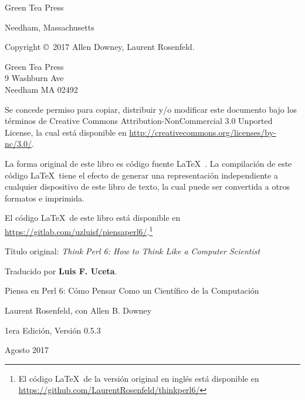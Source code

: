 \documentclass[10pt]{book}
\newcommand{\thetitle}{Piensa en Perl 6: Cómo Pensar Como un Científico de la Computación}
\newcommand{\theversion}{1era Edición, Versión 0.5.3}
\newcommand{\thedate}{Agosto 2017}
\begin{document}
\begin{latexonly}
\begin{flushright}
{\Large Green Tea Press}

{\small Needham, Massachusetts}

\vfill

\end{flushright}


\pagebreak
\thispagestyle{empty}

{\small
Copyright \copyright ~2017 Allen Downey, Laurent Rosenfeld.


\vspace{0.2in}

\begin{flushleft}
Green Tea Press       \\
9 Washburn Ave        \\
Needham MA 02492
\end{flushleft}

Se concede permiso para copiar, distribuir y/o modificar
este documento bajo los términos de Creative Commons Attribution-NonCommercial 3.0 Unported
License, la cual está disponible en \url{http://creativecommons.org/licenses/by-nc/3.0/}.

La forma original de este libro es código fuente \LaTeX\ . La compilación de
este código \LaTeX\ tiene el efecto de generar una representación independiente
a cualquier dispositivo de este libro de texto, la cual puede ser convertida a
otros formatos e imprimida.

El código \LaTeX\ de este libro está disponible en
\url{https://gitlab.com/uzluisf/piensaperl6/}.\footnote{
El código \LaTeX\ de la versión original en inglés está disponible en
\url{https://github.com/LaurentRosenfeld/thinkperl6/}
}

Título original: \emph{Think Perl 6: How to Think Like a Computer Scientist}

Traducido por {\bf Luis F. Uceta}.

\vspace{0.2in}

} %

\end{latexonly}



\begin{htmlonly}


{\Large \thetitle}

{\large Laurent Rosenfeld,
con Allen B. Downey}

\theversion

\thedate

\setcounter{chapter}{-1}

\end{htmlonly}
\end{document}
